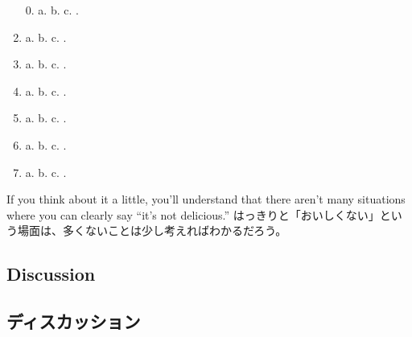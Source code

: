 \documentclass[uplatex,dvipdfmx,b5paper,english,10pt]{jsbook}
\begin{document}
\begin{enumerate}
 \itemsep=4pt
 \item[0.] a. \underline{\hspace{10em}} b. \underline{\hspace{10em}}  c. \hrulefill.
 \item a. \underline{\hspace{10em}} b. \underline{\hspace{10em}}  c. \hrulefill.
 \item a. \underline{\hspace{10em}} b. \underline{\hspace{10em}}  c. \hrulefill.
 \item a. \underline{\hspace{10em}} b. \underline{\hspace{10em}}  c. \hrulefill.
 \item a. \underline{\hspace{10em}} b. \underline{\hspace{10em}}  c. \hrulefill.
 \item a. \underline{\hspace{10em}} b. \underline{\hspace{10em}}  c. \hrulefill.
 \item a. \underline{\hspace{10em}} b. \underline{\hspace{10em}}  c. \hrulefill.
\end{enumerate}

\begin{toianswer}
\ifEnglish
If you think about it a little, you'll understand that there aren't many situations where you can clearly say ``it's not delicious.''
\else
はっきりと「おいしくない」という場面は、多くないことは少し考えればわかるだろう。
\fi
\end{toianswer}


\ifEnglish
\subsection{Discussion}
\else
\subsection{ディスカッション}
\fi
\end{document}
